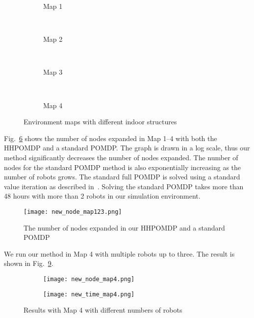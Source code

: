 \documentclass[../main.tex]{subfiles}
\begin{document}
\begin{figure}
\captionsetup{skip=0pt}
    \centering
    \begin{subfigure}[b]{0.22\textwidth}
        \centering
        \caption{Map 1}
        \label{fig:map1}
    \end{subfigure}\
    \begin{subfigure}[b]{0.22\textwidth}
        \centering
        \caption{Map 2}
        \label{fig:map2}
    \end{subfigure}\
    \begin{subfigure}[b]{0.22\textwidth}
        \centering
        \caption{Map 3}
        \label{fig:map3}
    \end{subfigure}\
    \begin{subfigure}[b]{0.22\textwidth}
        \centering
        \caption{Map 4}
        \label{fig:map4}
    \end{subfigure}
    \caption{Environment maps with different indoor structures}
    \label{fig:env_map}
\end{figure}

Fig.~\ref{fig:node_map123} shows the number of nodes expanded in Map 1--4 with both the HHPOMDP and a standard POMDP. The graph is drawn in a log scale, thus our method significantly decreases the number of nodes expanded. The number of nodes for the standard POMDP method is also exponentially increasing as the number of robots grows. The standard full POMDP is solved using a standard value iteration as described in~\cite{hauskrecht2000value}. Solving the standard POMDP takes more than 48 hours with more than 2 robots in our simulation environment.


\begin{figure}
\captionsetup{skip=0pt}
    \centering
    \texttt{[image: new\_node\_map123.png]}
    \caption{The number of nodes expanded in our HHPOMDP and a standard POMDP}
    \label{fig:node_map123}
\end{figure}

We run our method in Map 4 with multiple robots up to three. The result is shown in Fig.~\ref{fig:map4robot}.

\begin{figure}
\captionsetup{skip=0pt}
    \centering
    \begin{subfigure}[b]{0.48\textwidth}
        \centering
        \texttt{[image: new\_node\_map4.png]}
        \caption{}
        \label{fig:node_map4}
    \end{subfigure}
    \begin{subfigure}[b]{0.48\textwidth}
        \centering
        \texttt{[image: new\_time\_map4.png]}
        \caption{ }
        \label{fig:time_map4}
    \end{subfigure}
    \caption{Results with Map 4 with different numbers of robots}
    \label{fig:map4robot}
\end{figure}
\end{document}
